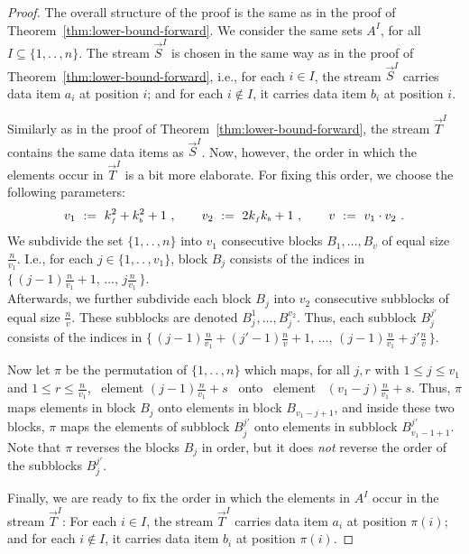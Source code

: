 \documentclass[proceedings]{stacs}
\theoremstyle{plain}\newtheorem{satz}[thm]{Satz}
\theoremstyle{definition}\newtheorem{crucial}[thm]{Crucial Definition}
\newcommand{\vek}[1]{\vec{#1}}
\renewcommand*{\leq}{\ensuremath{\leqslant}}
\newcommand{\twodots}{.\,.\,}
\newcommand{\set}[1]{\ensuremath{\{ #1 \}}}
\newcommand{\kf}{\ensuremath{k_{\scriptscriptstyle f}}}
\newcommand{\kb}{\ensuremath{k_{\scriptscriptstyle b}}}
\newcommand{\vv}{\ensuremath{v}}
\begin{document}
\begin{proof}
The overall structure of the proof is the same as in the proof of
Theorem~\ref{thm:lower-bound-forward}.
We consider the same sets $A^I$, for all $I\subseteq\set{1,\twodots,n}$.
The stream $\vek{S}^I$ is chosen in the same way as in the proof of
Theorem~\ref{thm:lower-bound-forward}, i.e., 
for each $i\in I$, the stream $\vek{S}^I$ carries  
data item $a_i$ at position $i$; and for each $i\not\in I$, it carries data item $b_i$ at
position $i$.

Similarly as in the proof of Theorem~\ref{thm:lower-bound-forward}, the
stream $\vek{T}^I$ contains the same data items as $\vek{S}^I$. Now, however, the
order in which the elements occur in $\vek{T}^I$ is a bit more elaborate.
For fixing this order, we choose the following parameters: \vspace{1ex}
\begin{equation}
  \vv_1 \ := \ \kf^2 + \kb^2 + 1\ ,
  \qquad
  \vv_2 \ := \ 2\kf \kb + 1\ ,
  \qquad
  \vv \ := \ v_1\cdot v_2\ .
  \vspace{1ex}
\end{equation}
We subdivide the set
$\set{1,\twodots,n}$ into $\vv_1$ consecutive blocks $B_1,\ldots, B_{\vv}$ of equal size 
$\frac{n}{\vv_1}$. I.e., for each $j\in\set{1,\twodots,\vv_1}$, block $B_j$ consists of the
indices in $\set{\, (j{-}1) \frac{n}{\vv_1} + 1, \,\ldots, \, j \frac{n}{\vv_1}\,}$.
\\
Afterwards, we further subdivide each block $B_j$ into $v_2$ consecutive subblocks of 
equal size $\frac{n}{\vv}$. These subblocks are denoted $B_{j}^1,\ldots,B_{j}^{\vv_2}$.
Thus, each subblock $B_{j}^{j'}$ consists of the indices in  
$\set{\, (j{-}1) \frac{n}{\vv_1} + (j'{-}1) \frac{n}{\vv} + 1, \,\ldots, \, 
 (j{-}1) \frac{n}{\vv_1} +  j' \frac{n}{\vv}\,}$.

Now let $\pi$ be the permutation of $\set{1,\twodots,n}$ which maps, for all $j,r$ with
$1\leq j\leq \vv_1$ and $1\leq r\leq \frac{n}{\vv_1}$, \ element 
$(j{-}1) \frac{n}{\vv_1} + s$ \ onto \ element \ 
$(\vv_1 {-} j) \frac{n}{\vv_1} + s$.
Thus, $\pi$ maps elements in block $B_j$ onto elements in block $B_{\vv_1-j+1}$, and
inside these two blocks, $\pi$ maps the elements of subblock $B_{j}^{j'}$ onto
elements in subblock $B_{\vv_1-1+1}^{j'}$. 
Note that $\pi$ reverses the blocks $B_j$ in order, but it does \emph{not} reverse the 
order of the subblocks $B_j^{j'}$.

Finally, we are ready to fix the order in which the elements in $A^I$ occur in the
stream $\vek{T}^I$: For each $i\in I$, the stream $\vek{T}^I$ carries
data item $a_i$ at position $\pi(i)$; and for each $i\not\in I$, it carries
data item $b_i$ at position $\pi(i)$.


\end{proof}
\end{document}
